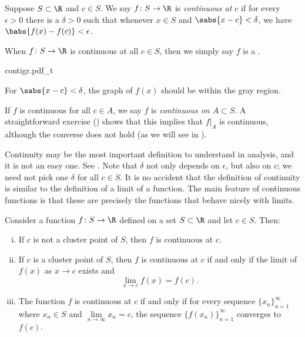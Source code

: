 \begin{defn}
Suppose $S \subset \R$ and $c \in S$.
We say $f \colon S \to \R$
is \emph{continuous at $c$}
if for every $\epsilon > 0$
there is a $\delta > 0$ such that whenever $x \in S$ and $\sabs{x-c} <
\delta$, we have
$\babs{f(x)-f(c)} < \epsilon$.


When $f \colon S \to \R$ is continuous at all $c \in S$, then we simply say
$f$ is a \emph{}.
\end{defn}
\begin{myfigureht}
{contigr.pdf_t}
\caption{For $\sabs{x-c} < \delta$, the graph of $f(x)$ should be within the gray region.\label{fig:contigr}}
\end{myfigureht}

If $f$ is continuous for all $c \in A$, we say
$f$ is \emph{continuous on $A \subset S$}.  A straightforward
exercise ()
shows that this implies that $f|_A$ is continuous, although
the converse does not hold (as we will see in ).

Continuity may be the most important definition to understand in analysis,
and it is not an easy one.  See .
Note that $\delta$ not only
depends on $\epsilon$, but also on $c$;  we need not pick
one $\delta$ for all $c \in S$.
It is no accident 
that the definition of continuity is similar to the definition of a
limit of a function.  The main feature of continuous functions
is that these are precisely the functions that behave nicely with limits.

\begin{prop} \label{contbasic:prop}
Consider a function $f \colon S \to \R$ defined on a set  $S \subset \R$
and let $c \in S$.
Then:
\begin{enumerate}[(i)]
\item \label{contbasic:prop:i}
If $c$ is not a cluster point of $S$, then $f$ is continuous at $c$.
\item \label{contbasic:prop:ii}
If $c$ is a cluster point of $S$, then $f$ is continuous at $c$
if and only if the limit of $f(x)$ as $x \to c$ exists and
\begin{equation*}
\lim_{x\to c} f(x) = f(c) .
\end{equation*}
\item \label{contbasic:prop:iii}
The function $f$ is continuous at $c$ if and only if for every sequence
$\{ x_n \}_{n=1}^\infty$
where $x_n \in S$ and $\lim\limits_{n\to\infty} x_n = c$, the sequence
$\bigl\{ f(x_n) \bigr\}_{n=1}^\infty$ converges
to $f(c)$.
\end{enumerate}
\end{prop}

